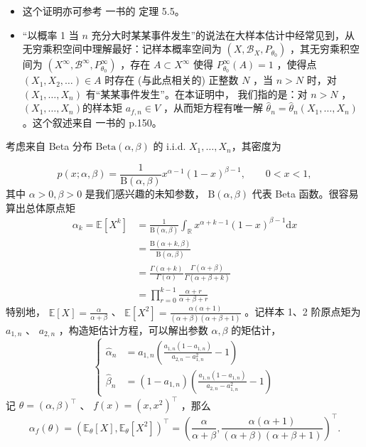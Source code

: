 \begin{remark}

\begin{itemize}
\tightlist
\item
  这个证明亦可参考 \cite{zhaolincheng2016} 一书的 定理 5.5。
\item
  ``以概率 1 当 $n$ 充分大时某某事件发生''的说法在大样本估计中经常见到，从无穷乘积空间中理解最好：记样本概率空间为 $(X,\mathscr B_X,P_{\theta_0})$ ，其无穷乘积空间为 $(X^\infty,\mathscr B^\infty,P_{\theta_0}^\infty)$ ，存在 $A\subset X^\infty$ 使得 $P_{\theta_0}^\infty(A)=1$ ，使得点 $(X_1,X_2,\dots)\in A$ 时存在 (与此点相关的) 正整数 $N$ ，当 $n>N$ 时，对 $(X_1,\dots,X_n)$ 有``某某事件发生''。在本证明中， 我们指的是：对 $n>N$ ， $(X_1,\dots,X_n)$的样本矩 $a_{f,n}\in V$ ，从而矩方程有唯一解 $\widehat\theta_n=\widehat\theta_n(X_1,\dots,X_n)$ 。这个叙述来自 \cite{chenxiru2009} 一书的 p.150。
\end{itemize}

\begin{example}
考虑来自 Beta 分布 $\mathrm{Beta}(\alpha,\beta)$ 的 i.i.d. $X_1,\dots,X_n$，其密度为

\[
p(x;\alpha,\beta)=\frac1{\mathrm{B}(\alpha,\beta)}
x^{\alpha-1}(1-x)^{\beta-1},\qquad 0<x<1,
\]
其中 $\alpha>0,\beta>0$ 是我们感兴趣的未知参数， $\mathrm{B}(\alpha,\beta)$ 代表 Beta 函数。很容易算出总体原点矩
\[\begin{aligned}\alpha_k=\mathbb{E}[X^k]&=\frac1{\mathrm{B}(\alpha,\beta)}\int_{\mathbb R} x^{\alpha+k-1}(1-x)^{\beta-1}\mathrm{d}x\\ &=\frac{\mathrm{B}(\alpha+k,\beta)}{\mathrm{B}(\alpha,\beta)}\\ &=\frac{\Gamma(\alpha+k)}{\Gamma(\alpha)}\frac{\Gamma(\alpha+\beta)}{\Gamma(\alpha+\beta+k)}\\ &=\prod_{r=0}^{k-1}\frac{\alpha+r}{\alpha+\beta+r} \end{aligned}\]
特别地， $\mathbb{E}[X]=\frac{\alpha}{\alpha+\beta}$ 、 $\mathbb{E}[X^2]=\frac{\alpha(\alpha+1)}{(\alpha+\beta)(\alpha+\beta+1)}$ 。记样本 1、2 阶原点矩为 $a_{1,n}$ 、 $a_{2,n}$ ，构造矩估计方程，可以解出参数 $\alpha,\beta$ 的矩估计，
\[\left\{\begin{aligned} \widehat\alpha_n&=a_{1,n}\left(\frac{a_{1,n}(1-a_{1,n})}{a_{2,n}-a_{1,n}^2}-1\right)\\ \widehat\beta_n&=(1-a_{1,n})\left(\frac{a_{1,n}(1-a_{1,n})}{a_{2,n}-a_{1,n}^2}-1\right) \end{aligned} \right.\]
记 $\theta=(\alpha,\beta)^\top$ 、 $f(x)=(x,x^2)^\top$ ，那么
\[
\alpha_f(\theta)=(\mathbb{E}_\theta[X],\mathbb{E}_\theta[X^2])^\top=\left(\frac\alpha{\alpha+\beta},\frac{\alpha(\alpha+1)}{(\alpha+\beta)(\alpha+\beta+1)}\right)^\top.
\]


\end{example}
\end{remark}
